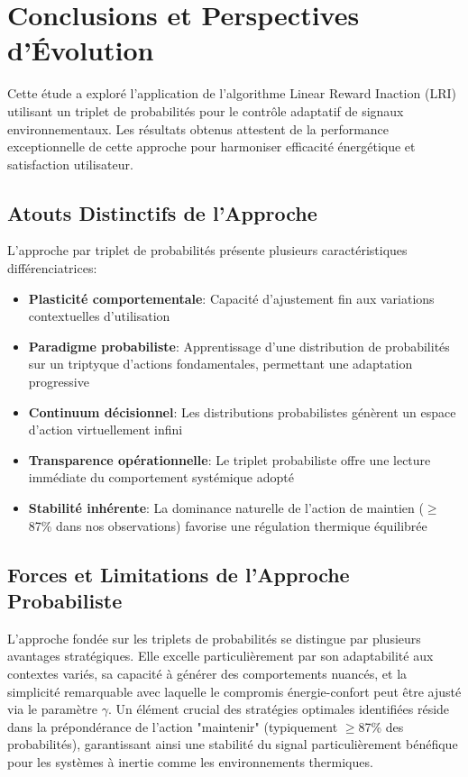 \documentclass[a4paper,11pt]{article}
\begin{document}
\section{Conclusions et Perspectives d'Évolution}

Cette étude a exploré l'application de l'algorithme Linear Reward Inaction (LRI) utilisant un triplet de probabilités pour le contrôle adaptatif de signaux environnementaux. Les résultats obtenus attestent de la performance exceptionnelle de cette approche pour harmoniser efficacité énergétique et satisfaction utilisateur.

\subsection{Atouts Distinctifs de l'Approche}

L'approche par triplet de probabilités présente plusieurs caractéristiques différenciatrices:

\begin{itemize}
    \item \textbf{Plasticité comportementale}: Capacité d'ajustement fin aux variations contextuelles d'utilisation
    \item \textbf{Paradigme probabiliste}: Apprentissage d'une distribution de probabilités sur un triptyque d'actions fondamentales, permettant une adaptation progressive
    \item \textbf{Continuum décisionnel}: Les distributions probabilistes génèrent un espace d'action virtuellement infini
    \item \textbf{Transparence opérationnelle}: Le triplet probabiliste offre une lecture immédiate du comportement systémique adopté
    \item \textbf{Stabilité inhérente}: La dominance naturelle de l'action de maintien ($\geq$87\% dans nos observations) favorise une régulation thermique équilibrée
\end{itemize}

\subsection{Forces et Limitations de l'Approche Probabiliste}

L'approche fondée sur les triplets de probabilités se distingue par plusieurs avantages stratégiques. Elle excelle particulièrement par son adaptabilité aux contextes variés, sa capacité à générer des comportements nuancés, et la simplicité remarquable avec laquelle le compromis énergie-confort peut être ajusté via le paramètre $\gamma$. Un élément crucial des stratégies optimales identifiées réside dans la prépondérance de l'action "maintenir" (typiquement $\geq$87\% des probabilités), garantissant ainsi une stabilité du signal particulièrement bénéfique pour les systèmes à inertie comme les environnements thermiques.
\end{document}

